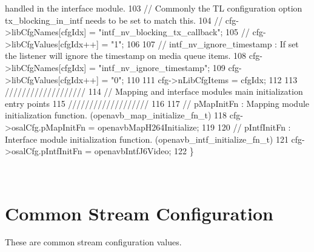 \begin{DoxyCode}
       handled in the interface module.
103     // Commonly the TL configuration option tx\_blocking\_in\_intf needs to be set to match this.
104     // cfg->libCfgNames[cfgIdx] = "intf\_nv\_blocking\_tx\_callback";
105     // cfg->libCfgValues[cfgIdx++] = "1";
106 
107     // intf\_nv\_ignore\_timestamp : If set the listener will ignore the timestamp on media queue items.
108     cfg->libCfgNames[cfgIdx] = "intf\_nv\_ignore\_timestamp";
109     cfg->libCfgValues[cfgIdx++] = "0";
110 
111     cfg->nLibCfgItems = cfgIdx;
112 
113     ///////////////////
114     // Mapping and interface modules main initialization entry points
115     ///////////////////
116 
117     // pMapInitFn : Mapping module initialization function. (openavb\_map\_initialize\_fn\_t)
118     cfg->osalCfg.pMapInitFn = openavbMapH264Initialize;
119 
120     // pIntfInitFn : Interface module initialization function. (openavb\_intf\_initialize\_fn\_t)
121     cfg->osalCfg.pIntfInitFn = openavbIntfJ6Video;
122 \} 
\end{DoxyCode}


~\newline
\hypertarget{sdk_avtp_stream_cfg_sdk_avtp_stream_cfg_common}{}\section{Common Stream Configuration }\label{sdk_avtp_stream_cfg_sdk_avtp_stream_cfg_common}
These are common stream configuration values.

